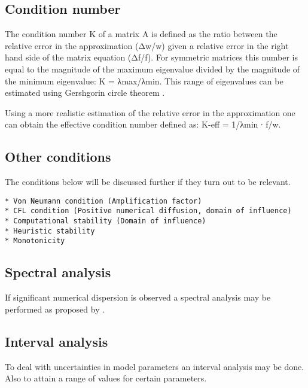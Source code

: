 \citep{Vuik2007}

\subsection{Condition number}\label{condition-number}

The condition number Κ of a matrix A is defined as the ratio between the
relative error in the approximation (Δw/w) given a relative error in the
right hand side of the matrix equation (Δf/f). For symmetric matrices
this number is equal to the magnitude of the maximum eigenvalue divided
by the magnitude of the minimum eigenvalue: Κ =
\textbar{}λmax\textbar{}/\textbar{}λmin\textbar{}. This range of
eigenvalues can be estimated using Gershgorin circle theorem
\citep[p.107]{Vuik2007}.

Using a more realistic estimation of the relative error in the
approximation one can obtain the effective condition number defined as:
Κ-eff = 1/λmin ∙ \textbar{}f\textbar{}/\textbar{}w\textbar{}.

\subsection{Other conditions}\label{other-conditions}

The conditions below will be discussed further if they turn out to be
relevant.

\begin{verbatim}
* Von Neumann condition (Amplification factor)
* CFL condition (Positive numerical diffusion, domain of influence)
* Computational stability (Domain of influence)
* Heuristic stability 
* Monotonicity
\end{verbatim}

\citep{zijlema_computational_2015}

\subsection{Spectral analysis}\label{spectral-analysis}

If significant numerical dispersion is observed a spectral analysis may
be performed as proposed by \citet{Ruano2019}.

\subsection{Interval analysis}\label{interval-analysis}

To deal with uncertainties in model parameters an interval analysis may
be done. Also to attain a range of values for certain parameters.

